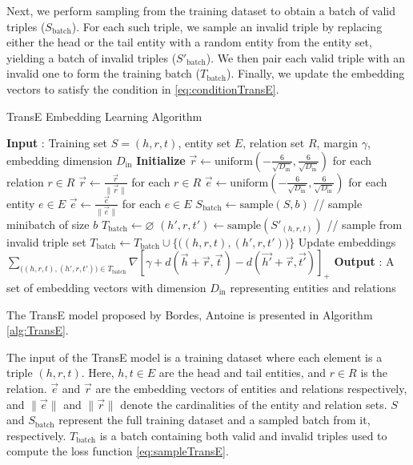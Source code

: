 Next, we perform sampling from the training dataset to obtain a batch of valid triples ($S_{\text{batch}}$). For each such triple, we sample an invalid triple by replacing either the head or the tail entity with a random entity from the entity set, yielding a batch of invalid triples ($S'_{\text{batch}}$). We then pair each valid triple with an invalid one to form the training batch ($T_{\text{batch}}$). Finally, we update the embedding vectors to satisfy the condition in \ref{eq:conditionTransE}.

\begin{algorithm}[H]
	\caption{TransE Embedding Learning Algorithm \protect\cite{bordes2013translating}}\label{alg:TransE}
	\begin{algorithmic}[1]
		\Statex \textbf{Input} :
		Training set $S = {(h, r, t)}$, entity set $E$, relation set $R$, margin $\gamma$, embedding dimension $D_{\text{in}}$	
		\Statex \textbf{Initialize}
		\State $\overrightarrow{r} \leftarrow \text{uniform}(-\frac{6}{\sqrt{D_{\text{in}}}}, \frac{6}{\sqrt{D_{\text{in}}}})$ for each relation $r \in R$
		\State $\overrightarrow{r} \leftarrow \frac{\overrightarrow{r}}{\|\overrightarrow{r}\|}$ for each $r \in R$
		\State $\overrightarrow{e} \leftarrow \text{uniform}(-\frac{6}{\sqrt{D_{\text{in}}}}, \frac{6}{\sqrt{D_{\text{in}}}})$ for each entity $e \in E$
		\Loop
		\State $\overrightarrow{e} \leftarrow \frac{\overrightarrow{e}}{\|\overrightarrow{e}\|}$ for each $e \in E$
		\State $S_{\text{batch}} \leftarrow \text{sample}(S, b)$  // sample minibatch of size $b$
		\State $T_{\text{batch}} \leftarrow \varnothing $
		\State $(h', r, t') \leftarrow \text{sample}(S'_{(h, r, t)})$ // sample from invalid triple set
		\State $T_{\text{batch}} \leftarrow T_{\text{batch}} \cup \Big\{ \Big( (h, r, t), (h', r, t') \Big) \Big\}$
		\EndFor
		\Statex Update embeddings
		\State $\sum_{\Big( (h, r, t), (h', r, t')\Big) \in T_{\text{batch}}} \nabla [\gamma + d(\overrightarrow{h} + \overrightarrow{r}, \overrightarrow{t}) - d(\overrightarrow{h'} + \overrightarrow{r}, \overrightarrow{t'})]_{+}$
		\EndLoop
		\Statex \textbf{Output} :
		A set of embedding vectors with dimension $D_{\text{in}}$ representing entities and relations
	\end{algorithmic}
\end{algorithm}

The TransE model proposed by Bordes, Antoine \cite{bordes2013translating} is presented in Algorithm \ref{alg:TransE}.


The input of the TransE model is a training dataset where each element is a triple $(h, r, t)$. Here, $h, t \in E$ are the head and tail entities, and $r \in R$ is the relation. $\overrightarrow{e}$ and $\overrightarrow{r}$ are the embedding vectors of entities and relations respectively, and $\|\overrightarrow{e}\|$ and $\|\overrightarrow{r}\|$ denote the cardinalities of the entity and relation sets. $S$ and $S_{\text{batch}}$ represent the full training dataset and a sampled batch from it, respectively. $T_{\text{batch}}$ is a batch containing both valid and invalid triples used to compute the loss function \ref{eq:sampleTransE}.

